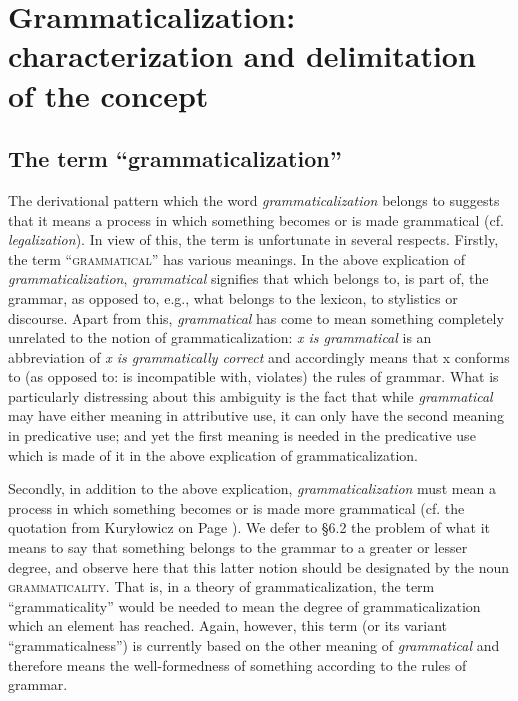 \chapter{Grammaticalization: characterization and delimitation of the concept} \label{chap:2}

\section{The term ``grammaticalization''} \label{sec:2.1}

The derivational pattern which the word \textit{grammaticalization} belongs to suggests that it means a process in which something becomes or is made grammatical (cf. \textit{legalization}). In view of this, the term is unfortunate in several respects. Firstly, the term ``\textsc{grammatical}'' has various meanings. In the above explication of \textit{grammaticalization}, \textit{grammatical} signifies that which belongs to, is part of, the grammar, as opposed to, e.g., what belongs to the lexicon, to stylistics or discourse. Apart from this, \textit{grammatical} has come to mean something completely unrelated to the notion of grammaticalization: \textit{x is grammatical} is an abbreviation of \textit{x is grammatically correct} and accordingly means that x conforms to (as opposed to: is incompatible with, violates) the rules of grammar. What is particularly distressing about this ambiguity is the fact that while \textit{grammatical} may have either meaning in attributive use, it can only have the second meaning in predicative use; and yet the first meaning is needed in the predicative use which is made of it in the above explication of grammaticalization.

Secondly, in addition to the above explication, \textit{grammaticalization} must mean a process in which something becomes or is made  more grammatical (cf. the quotation from Kuryłowicz on Page \pageref{quote:kurylowciz}). We defer to §6.2 the problem of what it means to say that something belongs to the grammar to a greater or lesser degree, and observe here that this latter notion should be designated by the noun \textsc{grammaticality}. That is, in a theory of grammaticalization, the term ``grammaticality'' would be needed to mean the degree of grammaticalization which an element has reached. Again, however, this term (or its variant ``grammaticalness'') is currently based on the other meaning of \textit{grammatical} and therefore means the well-formedness of something according to the rules of grammar.

